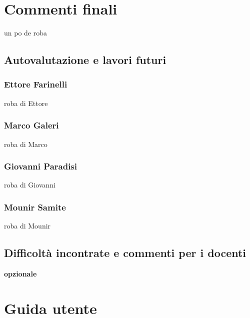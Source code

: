 \documentclass[a4paper,12pt]{report}
\begin{document}
\chapter{Commenti finali}

un po de roba

\section{Autovalutazione e lavori futuri}
\subsection*{Ettore Farinelli}
roba di Ettore
\subsection*{Marco Galeri}
roba di Marco
\subsection*{Giovanni Paradisi}
roba di Giovanni
\subsection*{Mounir Samite}
roba di Mounir

\section{Difficoltà incontrate e commenti per i docenti}

\textbf{opzionale}



\appendix


\chapter{Guida utente}





\end{document}
